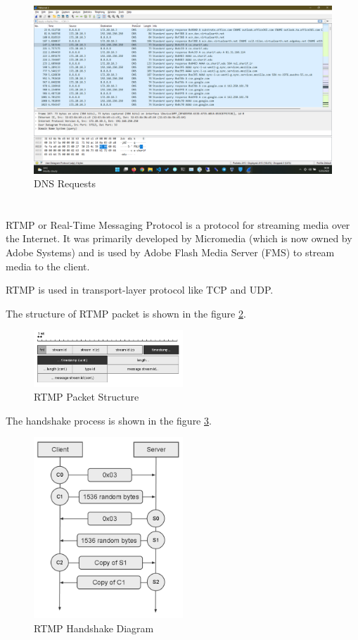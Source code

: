 \documentclass[en]{university}
\begin{document}
\begin{figure}
    \centering
    \includegraphics[width=\textwidth]{./resources/WSDNS.png}
    \caption{DNS Requests}
    \label{fig:WSDNS}
\end{figure}

\section{}
RTMP or Real-Time Messaging Protocol is a protocol for streaming media over the Internet. It was primarily developed by Micromedia (which is now owned by Adobe Systems) and is used by Adobe Flash Media Server (FMS) to stream media to the client. 

RTMP is used in transport-layer protocol like TCP and UDP.

The structure of RTMP packet is shown in the figure \ref{fig:RTMPPacket}. 

\begin{figure}
    \centering
    \includegraphics[width=0.5\textwidth]{./resources/RTMPPacket.png}
    \caption{RTMP Packet Structure}
    \label{fig:RTMPPacket}
\end{figure}

The handshake process is shown in the figure \ref{fig:RTMPHandshake}.

\begin{figure}
    \centering
    \includegraphics[width=0.5\textwidth]{./resources/RTMPHandshake.png}
    \caption{RTMP Handshake Diagram}
    \label{fig:RTMPHandshake}
\end{figure}
\end{document}
